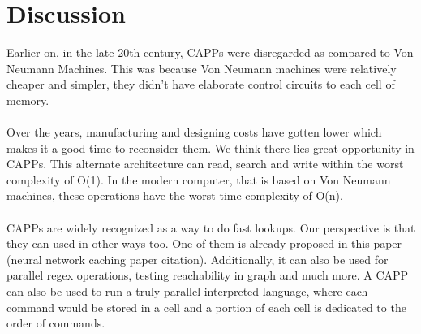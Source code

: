 \section{Discussion}
Earlier on, in the late 20th century, CAPPs were disregarded as compared to Von Neumann Machines. 
This was because Von Neumann machines were relatively cheaper and simpler, they didn't have elaborate control circuits to each cell of memory. 
\\\\
Over the years, manufacturing and designing costs have gotten lower which makes it a good time to reconsider them. We think there lies great opportunity in CAPPs.
This alternate architecture can read, search and write within the worst complexity of O(1). 
In the modern computer, that is based on Von Neumann machines, these operations have the worst time complexity of O(n). 
\\\\
CAPPs are widely recognized as a way to do fast lookups. 
Our perspective is that they can used in other ways too.
One of them is already proposed in this paper (neural network caching paper citation). 
Additionally, it can also be used for parallel regex operations, testing reachability in graph and much more. 
A CAPP can also be used to run a truly parallel interpreted language, 
where each command would be stored in a cell and a portion of each cell is dedicated to the order of commands.